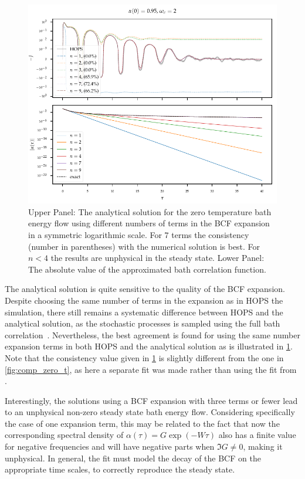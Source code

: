 \begin{figure}[htp]
  \centering
  \includegraphics{figs/analytic_comp/analytical_terms_important.pdf}
  \caption{\label{fig:analytical_terms_important} Upper Panel: The
    analytical solution for the zero temperature bath energy flow
    using different numbers of terms in the BCF expansion in a
    symmetric logarithmic scale. For \(7\) terms the consistency
    (number in parentheses) with the numerical solution is best. For
    \(n<4\) the results are unphysical in the steady state.  Lower
    Panel: The absolute value of the approximated bath correlation
    function.}
\end{figure}

The analytical solution is quite sensitive to the quality of the BCF
expansion.  Despite choosing the same number of terms in the expansion
as in HOPS the simulation, there still remains a systematic difference
between HOPS and the analytical solution, as the stochastic processes
is sampled using the full bath correlation~\cite{RichardDiss}.
Nevertheless, the best agreement is found for using the same number
expansion terms in both HOPS and the analytical solution as is
illustrated in \cref{fig:analytical_terms_important}. Note that the
consistency value given in \cref{fig:analytical_terms_important} is
slightly different from the one in \cref{fig:comp_zero_t}, as here a
separate fit was made rather than using the fit from
\cite{RichardDiss}.

Interestingly, the solutions using a BCF expansion with three terms or
fewer lead to an unphysical non-zero steady state bath energy
flow. Considering specifically the case of one expansion term, this
may be related to the fact that now the corresponding spectral density
of \(α(τ)=G \exp(-Wτ)\) also has a finite value for negative
frequencies and will have negative parts when \(\Im G \neq 0\), making
it unphysical.  In general, the fit must model the decay of the BCF on
the appropriate time scales, to correctly reproduce the steady state.

